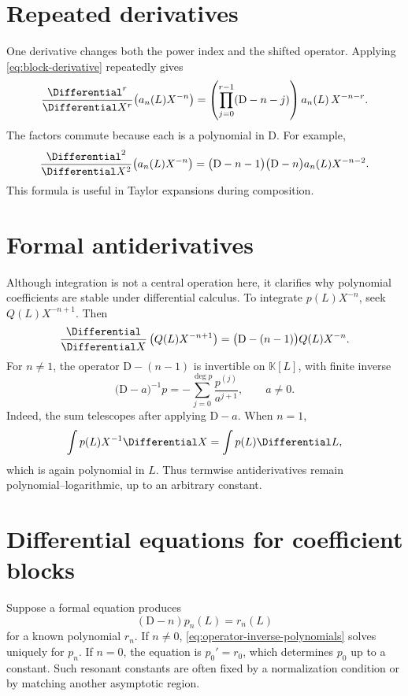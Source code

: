 \documentclass[11pt,openany]{book}
\theoremstyle{definition}
\theoremstyle{plain}
\theoremstyle{remark}
\newcommand{\K}{\mathbb{K}}
\newcommand{\Dop}{\mathrm{D}}
\begin{document}
\section{Repeated derivatives}
One derivative changes both the power index and the shifted operator.  Applying
\cref{eq:block-derivative} repeatedly gives
\begin{equation}\label{eq:repeated-derivative}
 \frac{\Differential^r}{\Differential X^r}\bigl(a_n(L)X^{-n}\bigr)
 =\left(\prod_{j=0}^{r-1}(\Dop-n-j)\right)a_n(L)\,X^{-n-r}.
\end{equation}
The factors commute because each is a polynomial in \(\Dop\).  For example,
\[
 \frac{\Differential^2}{\Differential X^2}\bigl(a_n(L)X^{-n}\bigr)
 =\bigl(\Dop-n-1\bigr)\bigl(\Dop-n\bigr)a_n(L)X^{-n-2}.
\]
This formula is useful in Taylor expansions during composition.

\section{Formal antiderivatives}
Although integration is not a central operation here, it clarifies why
polynomial coefficients are stable under differential calculus.  To integrate
\(p(L)X^{-n}\), seek \(Q(L)X^{-n+1}\).  Then
\[
 \frac{\Differential}{\Differential X}\left(Q(L)X^{-n+1}\right)
 =\bigl(\Dop-(n-1)\bigr)Q(L)X^{-n}.
\]
For \(n\ne1\), the operator \(\Dop-(n-1)\) is invertible on \(\K[L]\), with
finite inverse
\begin{equation}\label{eq:operator-inverse-polynomials}
 \bigl(\Dop-a\bigr)^{-1}p
 =-\sum_{j=0}^{\deg p}\frac{p^{(j)}}{a^{j+1}},
 \qquad a\ne0.
\end{equation}
Indeed, the sum telescopes after applying \(\Dop-a\).  When \(n=1\),
\[
 \int p(L)X^{-1}\Differential X=\int p(L)\Differential L,
\]
which is again polynomial in \(L\).  Thus termwise antiderivatives remain
polynomial--logarithmic, up to an arbitrary constant.

\section{Differential equations for coefficient blocks}
Suppose a formal equation produces
\[
 (\Dop-n)p_n(L)=r_n(L)
\]
for a known polynomial \(r_n\).  If \(n\ne0\), \cref{eq:operator-inverse-polynomials}
solves uniquely for \(p_n\).  If \(n=0\), the equation is
\(p_0'=r_0\), which determines \(p_0\) up to a constant.  Such resonant
constants are often fixed by a normalization condition or by matching another
asymptotic region.
\end{document}
